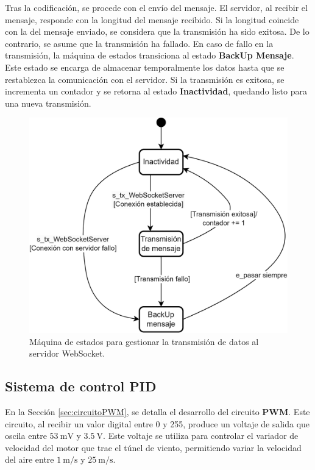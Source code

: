 Tras la codificación, se procede con el envío del mensaje. El servidor, al recibir el mensaje, responde con la longitud del mensaje recibido. Si la longitud coincide con la del mensaje enviado, se considera que la transmisión ha sido exitosa. De lo contrario, se asume que la transmisión ha fallado. En caso de fallo en la transmisión, la máquina de estados transiciona al estado \textbf{BackUp Mensaje}. Este estado se encarga de almacenar temporalmente los datos hasta que se restablezca la comunicación con el servidor. Si la transmisión es exitosa, se incrementa un contador y se retorna al estado \textbf{Inactividad}, quedando listo para una nueva transmisión.


\begin{figure}[H]
    \centering
    \includegraphics[width=0.7\linewidth]{Figuras/datalogger/Firmware/sc_transmisionServer.png}
    \caption{Máquina de estados para gestionar la transmisión de datos al servidor WebSocket.}
    \label{fig:sc_transmisionServer}
\end{figure}


\subsection{Sistema de control PID}\label{sec:sistemaDeControlPid}

En la Sección \ref{sec:circuitoPWM}, se detalla el desarrollo del circuito \textbf{PWM}. Este circuito, al recibir un valor digital entre 0 y 255, produce un voltaje de salida que oscila entre $\SI{53}{\milli\volt}$ y $\SI{3.5}{\volt}$. Este voltaje se utiliza para controlar el variador de velocidad del motor que trae el túnel de viento, permitiendo variar la velocidad del aire entre $\SI{1}{\meter\per\second}$ y $\SI{25}{\meter\per\second}$.

